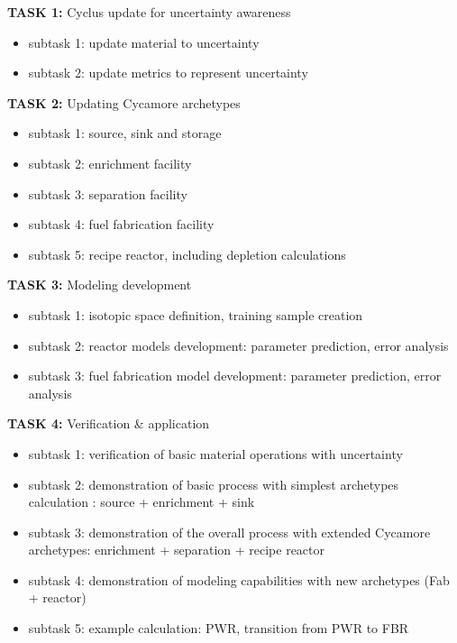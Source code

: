 \documentclass[dvips,11pt]{article}
\begin{document}
\newpage
\noindent\textbf{TASK 1:} Cyclus update for uncertainty awareness
\begin{itemize}[nosep]
\item subtask 1: update material to uncertainty
\item subtask 2: update metrics to represent uncertainty
\end{itemize}

\noindent\textbf{TASK 2:} Updating Cycamore archetypes
\begin{itemize}[nosep]
\item subtask 1: source, sink and storage
\item subtask 2: enrichment facility 
\item subtask 3: separation facility
\item subtask 4: fuel fabrication facility
\item subtask 5: recipe reactor, including depletion calculations
\end{itemize}

\noindent\textbf{TASK 3:} Modeling development
\begin{itemize}[nosep]
\item subtask 1: isotopic space definition,
  training sample creation
\item subtask 2: reactor models development:
  parameter prediction, error analysis
\item subtask 3: fuel fabrication model
  development: parameter prediction, error
  analysis
\end{itemize}
 
\noindent\textbf{TASK 4:} Verification \& application
\begin{itemize}[nosep]
\item subtask 1: verification of basic material
  operations with uncertainty
\item subtask 2: demonstration of basic process
  with simplest archetypes calculation : source +
  enrichment + sink
\item subtask 3: demonstration of the overall
  process with extended Cycamore archetypes:
  enrichment + separation + recipe reactor
\item subtask 4: demonstration of modeling
  capabilities with new archetypes (Fab + reactor)
\item subtask 5: example calculation: PWR,
  transition from PWR to FBR
\end{itemize}
\end{document}
